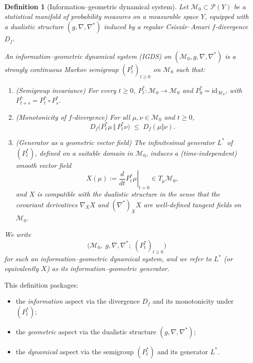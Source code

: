 \documentclass[11pt]{article}
\newtheorem{definition}{Definition}
\newcommand{\Pcal}{\mathcal{P}}
\newcommand{\Mcal}{\mathcal{M}}
\begin{document}
\begin{definition}[Information--geometric dynamical system]
\label{def:ig-dynamical-system}
Let $\Mcal_0 \subset \Pcal(Y)$ be a statistical manifold of probability
measures on a measurable space $Y$, equipped with a dualistic structure
$(g,\nabla,\nabla^\ast)$ induced by a regular Csiszár--Amari
$f$-divergence $D_f$.

An \emph{information--geometric dynamical system} (IGDS) on
$(\Mcal_0,g,\nabla,\nabla^\ast)$ is a strongly continuous Markov
semigroup $(P_t^\ast)_{t\ge 0}$ on $\Mcal_0$ such that:
\begin{enumerate}[label=(IG\arabic*),leftmargin=1.8em]
  \item (\emph{Semigroup invariance}) For every $t\ge 0$,
  $P_t^\ast : \Mcal_0 \to \Mcal_0$ and
  $P_0^\ast = \mathrm{id}_{\Mcal_0}$, with
  $P_{t+s}^\ast = P_t^\ast \circ P_s^\ast$.
  \item (\emph{Monotonicity of $f$-divergence})
  For all $\mu,\nu \in \Mcal_0$ and $t\ge 0$,
  \[
    D_f\bigl(P_t^\ast \mu \,\Vert\, P_t^\ast \nu\bigr)
    \;\le\;
    D_f(\mu\Vert\nu).
  \]
  \item (\emph{Generator as a geometric vector field})
  The infinitesimal generator $L^\ast$ of $(P_t^\ast)$,
  defined on a suitable domain in $\Mcal_0$, induces a (time-independent)
  smooth vector field
  \[
    X(\mu) := \left.\frac{d}{dt} P_t^\ast \mu\right|_{t=0}
    \in T_\mu \Mcal_0,
  \]
  and $X$ is compatible with the dualistic structure in the sense that
  the covariant derivatives $\nabla_X X$ and $(\nabla^\ast)_X X$ are
  well-defined tangent fields on $\Mcal_0$.
\end{enumerate}

We write
\[
  \bigl(\Mcal_0,\; g,\nabla,\nabla^\ast;\; (P_t^\ast)_{t\ge 0}\bigr)
\]
for such an information--geometric dynamical system, and we refer to
$L^\ast$ (or equivalently $X$) as its \emph{information--geometric
generator}.
\end{definition}

This definition packages:
\begin{itemize}[leftmargin=1.5em]
  \item the \emph{information} aspect via the divergence $D_f$ and its
  monotonicity under $(P_t^\ast)$;
  \item the \emph{geometric} aspect via the dualistic structure
  $(g,\nabla,\nabla^\ast)$;
  \item the \emph{dynamical} aspect via the semigroup $(P_t^\ast)$ and
  its generator $L^\ast$.
\end{itemize}
\end{document}
